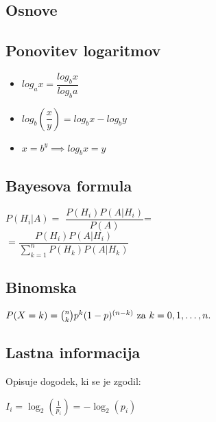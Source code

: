 \documentclass{article}
\begin{document}
\begin{multicols}{4}

\section{Osnove}


\subsection{Ponovitev logaritmov}
\begin{small}
    \begin{itemize} 
        \item $log_a x = \dfrac{log_b x}{log_b a}$
        \item $log_b(\dfrac{x}{y}) = log_b x - log_b y$
        \item $x = b^y \implies log_b x = y$
    \end{itemize}
\end{small}

\subsection{Bayesova formula}
\begin{center}
    \begin{math}
        P(H_{i} | A) = 
    \end{math}
    \begin{math}
        \dfrac{P(H_{i}) P(A | H_{i})}{P(A)}
    \end{math}=\\
    \begin{math}
        = \dfrac{P(H_{i}) P(A | H_{i})}{\sum_{k=1}^{n} P(H_{k}) P(A | H_{k})}
    \end{math}        
\end{center}

\subsection{Binomska}
\begin{center}
    \begin{math}
        P(X = k) = {n \choose k} p^{k} (1 - p)^{(n - k)}$ za $k = 0,1, \dots, n.
    \end{math}
\end{center}

\subsection{Lastna informacija}
Opisuje dogodek, ki se je zgodil:
\begin{center}
    \begin{math}
        I_i = \log_2(\frac{1}{p_i}) = - \log_2(p_i)
    \end{math}
\end{center}


\end{multicols}
\end{document}
